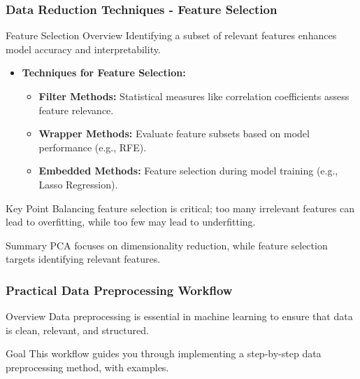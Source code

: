 \documentclass[aspectratio=169]{beamer}
\begin{document}
\begin{frame}[fragile]
    \frametitle{Data Reduction Techniques - Feature Selection}
    \begin{block}{Feature Selection Overview}
        Identifying a subset of relevant features enhances model accuracy and interpretability.
    \end{block}

    \begin{itemize}
        \item \textbf{Techniques for Feature Selection:}
        \begin{itemize}
            \item \textbf{Filter Methods:} Statistical measures like correlation coefficients assess feature relevance.
            \item \textbf{Wrapper Methods:} Evaluate feature subsets based on model performance (e.g., RFE).
            \item \textbf{Embedded Methods:} Feature selection during model training (e.g., Lasso Regression).
        \end{itemize}
    \end{itemize}

    \begin{block}{Key Point}
        Balancing feature selection is critical; too many irrelevant features can lead to overfitting, while too few may lead to underfitting.
    \end{block}
    
    \begin{block}{Summary}
        PCA focuses on dimensionality reduction, while feature selection targets identifying relevant features.
    \end{block}
\end{frame}

\begin{frame}
    \frametitle{Practical Data Preprocessing Workflow}
    \begin{block}{Overview}
        Data preprocessing is essential in machine learning to ensure that data is clean, relevant, and structured.
    \end{block}
    \begin{block}{Goal}
        This workflow guides you through implementing a step-by-step data preprocessing method, with examples.
    \end{block}
\end{frame}
\end{document}
